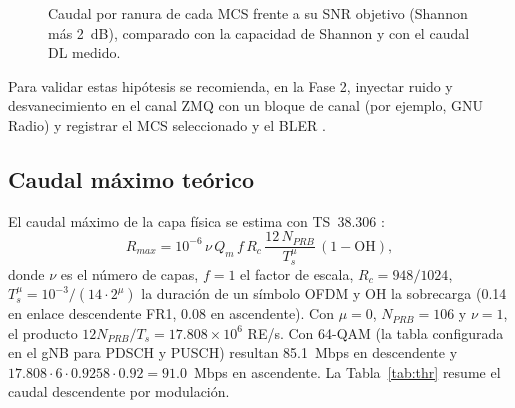 \documentclass[conference]{IEEEtran}
\begin{document}
\begin{figure}[!t]
\centering
{}
\caption{Caudal por ranura de cada MCS frente a su SNR objetivo (Shannon más 2~dB), comparado con la capacidad de Shannon y con el caudal DL medido.}
\label{fig:mcsplot}
\end{figure}

Para validar estas hipótesis se recomienda, en la Fase 2, inyectar ruido y desvanecimiento en el canal ZMQ con un bloque de canal (por ejemplo, GNU Radio) y registrar el MCS seleccionado y el BLER \cite{srsran}.

\subsection{Caudal máximo teórico}
El caudal máximo de la capa física se estima con TS~38.306 \cite{ts38306}:
\begin{equation}
R_{max}=10^{-6}\,\nu\,Q_m\,f\,R_{c}\,\frac{12\,N_{PRB}}{T_s^{\mu}}\,(1-\mathrm{OH}),
\end{equation}
donde $\nu$ es el número de capas, $f=1$ el factor de escala, $R_c=948/1024$, $T_s^{\mu}=10^{-3}/(14\cdot2^{\mu})$ la duración de un símbolo OFDM y OH la sobrecarga (0.14 en enlace descendente FR1, 0.08 en ascendente). Con $\mu=0$, $N_{PRB}=106$ y $\nu=1$, el producto $12N_{PRB}/T_s=17.808\times10^{6}$ RE/s. Con 64-QAM (la tabla configurada en el gNB para PDSCH y PUSCH) resultan 85.1~Mbps en descendente y $17.808\cdot6\cdot0.9258\cdot0.92=91.0$~Mbps en ascendente. La Tabla~\ref{tab:thr} resume el caudal descendente por modulación.
\end{document}
